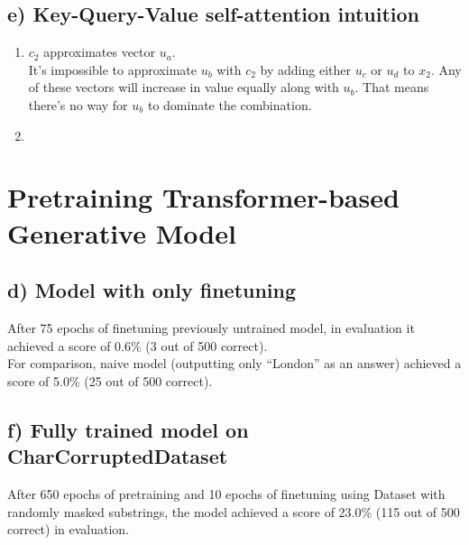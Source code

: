 \documentclass[12pt]{article}
\begin{document}
\subsection*{e) Key-Query-Value self-attention intuition }
\begin{enumerate}
  \item
    \(c_2\) approximates vector \(u_a\). \\
    It's impossible to approximate \(u_b\) with \(c_2\) by adding either \(u_c\) or \(u_d\) to \(x_2\).
    Any of these vectors will increase in value equally along with \(u_b\). That means there's no way
    for \(u_b\) to dominate the combination. \\
  \item
\end{enumerate}
    
\section{Pretraining Transformer-based Generative Model}
\subsection*{d) Model with only finetuning}
After 75 epochs of finetuning previously untrained model, in evaluation it achieved a score of 0.6\% (3 out of 500 correct). \\
For comparison, naive model (outputting only ``London'' as an answer) achieved a score of 5.0\% (25 out of 500 correct). \\
\subsection*{f) Fully trained model on CharCorruptedDataset}
After 650 epochs of pretraining and 10 epochs of finetuning using Dataset with randomly masked substrings, the model achieved a score of 23.0\% (115 out of 500 correct) in evaluation. \\

 
\end{document}
